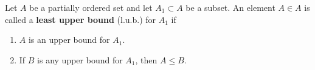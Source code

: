 Let $A$ be a partially ordered set and let $A_1 \subset A$ be a subset. An element $A \in A$ is called a \textbf{least upper bound} (l.u.b.) for $A_1$ if

\begin{enumerate}
  \item $A$ is an upper bound for $A_1$.
  \item If $B$ is any upper bound for $A_1$, then $A \leq B$.
\end{enumerate}
